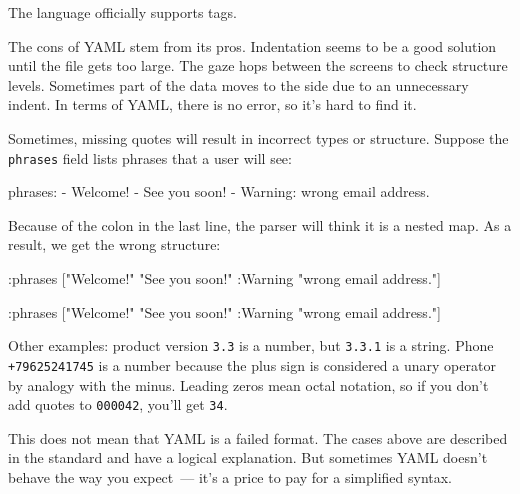 The language officially supports tags.


The cons of YAML stem from its pros. Indentation seems to be a good solution until the file gets too large. The gaze hops between the screens to check structure levels. Sometimes part of the data moves to the side due to an unnecessary indent. In terms of YAML, there is no error, so it's hard to find it.

Sometimes, missing quotes will result in incorrect types or structure. Suppose the \verb|phrases| field lists phrases that a user will see:

\begin{english}
  \begin{yaml}
phrases:
  - Welcome!
  - See you soon!
  - Warning: wrong email address.
  \end{yaml}
\end{english}

Because of the colon in the last line, the parser will think it is a nested map. As a result, we get the wrong structure:

\ifx\DEVICETYPE\MOBILE

\begin{english}
  \begin{clojure}
{:phrases
 ["Welcome!"
  "See you soon!"
  {:Warning "wrong email address."}]}
  \end{clojure}
\end{english}

\else

\begin{english}
  \begin{clojure}
{:phrases ["Welcome!"
           "See you soon!"
           {:Warning "wrong email address."}]}
  \end{clojure}
\end{english}

\fi

Other examples: product version \verb|3.3| is a number, but \verb|3.3.1| is a string. Phone \texttt{+79625241745} is a number because the plus sign is considered a unary operator by analogy with the minus. Leading zeros mean octal notation, so if you don't add quotes to \verb|000042|, you'll get \verb|34|.

This does not mean that YAML is a failed format. The cases above are described in the standard and have a logical explanation. But sometimes YAML doesn't behave the way you expect~--- it’s a price to pay for a simplified syntax.

